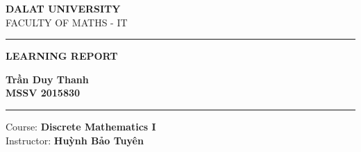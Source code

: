 \begin{titlepage}
\begin{center} 
    {\bf \Large DALAT UNIVERSITY}\\
    {\normalsize FACULTY OF MATHS - IT}\\
\end{center}

\vspace{5cm}
\par\noindent\rule{\textwidth}{1pt}
\vspace{0.3cm}
\begin{center}
	\bf \Large LEARNING REPORT
\end{center}
\begin{center}
    \bf \Huge Trần Duy Thanh\\
    \vspace{0.3cm}
    \normalsize MSSV 2015830\\
\end{center}
\vspace{0.3cm}
\par\noindent\rule{\textwidth}{1pt}
\vspace{4cm}

\begin{center}
    \large Course: \textbf{Discrete Mathematics I}\\
    \large Instructor: \textbf{Huỳnh Bảo Tuyên} 
\end{center}
\vspace{5cm}
\begin{center}
\end{center}
\end{titlepage}
